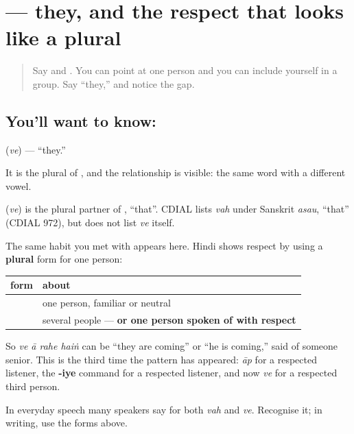 \section[\texorpdfstring{\hi{वे} (ve)}{वे (ve)}]{ — they, and the respect that looks like a plural}

\label{lesson:HI-C86-ve}



\begin{quote}
Say \textbf{} and \textbf{}. You can point at one person and you can include yourself in a group. Say \textquotedblleft{}they,\textquotedblright{} and notice the gap.
\end{quote}

\subsection*{You'll want to know: }
\textbf{} (\emph{ve}) — \textquotedblleft{}they.\textquotedblright{}

It is the plural of \textbf{}, and the relationship is visible: the same word with a different vowel.

\begin{cousinweb}
\textbf{} (\emph{ve}) is the plural partner of \textbf{}, \textquotedblleft{}that\textquotedblright{}. CDIAL lists \emph{vah} under Sanskrit \emph{asau}, \textquotedblleft{}that\textquotedblright{} (CDIAL 972), but does not list \emph{ve} itself.
\end{cousinweb}

\begin{grammarlens}[title={Grammar Lens: the plural that is also a courtesy}]
The same habit you met with \textbf{} appears here. Hindi shows respect by using a \textbf{plural} form for one person:

\noindent
\begin{tabularx}{\linewidth}{@{}>{\raggedright\arraybackslash}X>{\raggedright\arraybackslash}X@{}}
\toprule
\textbf{form} & \textbf{about} \\
\midrule
\hi{वह} & one person, familiar or neutral \\
\textbf{\hi{वे}} & several people — \textbf{or one person spoken of with respect} \\
\bottomrule
\end{tabularx}

So \emph{ve ā rahe haiṅ} can be \textquotedblleft{}they are coming\textquotedblright{} or \textquotedblleft{}he is coming,\textquotedblright{} said of someone senior. This is the third time the pattern has appeared: \emph{āp} for a respected listener, the \textbf{-iye} command for a respected listener, and now \emph{ve} for a respected third person.

In everyday speech many speakers say \textbf{} for both \emph{vah} and \emph{ve}. Recognise it; in writing, use the forms above.
\end{grammarlens}

